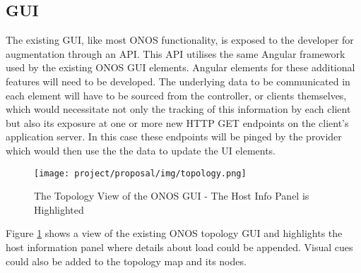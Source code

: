 \subsection{GUI}
The existing GUI, like most ONOS functionality, is exposed to the developer for augmentation through an API. This API utilises the same Angular framework used by the existing ONOS GUI elements. Angular elements for these additional features will need to be developed. The underlying data to be communicated in each element will have to be sourced from the controller, or clients themselves, which would necessitate not only the tracking of this information by each client but also its exposure at one or more new HTTP GET endpoints on the client's application server. In this case these endpoints will be pinged by the provider which would then use the the data to update the UI elements.

\begin{figure}[H]
    \centering
    \texttt{[image: project/proposal/img/topology.png]}
    \caption{The Topology View of the ONOS GUI - The Host Info Panel is Highlighted \cite{hunt_2016}}
    \label{fig:topo}
\end{figure}

Figure \ref{fig:topo} shows a view of the existing ONOS topology GUI and highlights the host information panel where details about load could be appended. Visual cues could also be added to the topology map and its nodes.